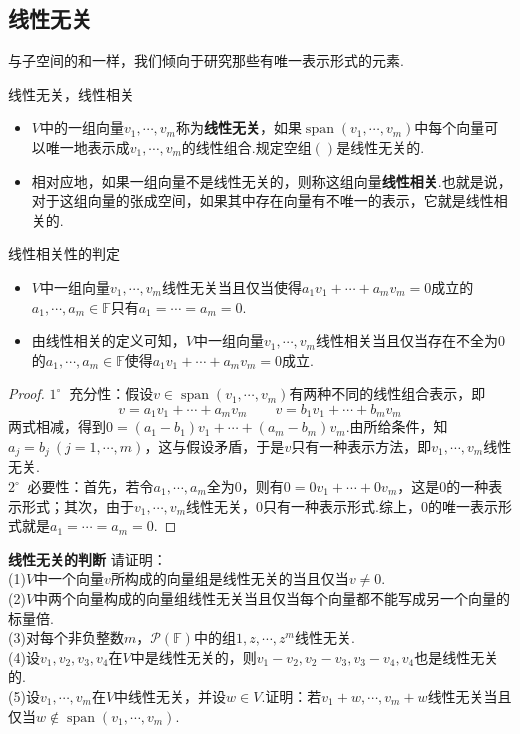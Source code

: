 \documentclass[lang=cn, zihao=5]{elegantbook}
\newcommand{\F}{\mathbb{F}}
\newcommand{\buzhou}[1]{$#1^{\circ} \ $}
\DeclareMathOperator{\spn}{span}
\newcommand{\examplefont}[1]{\color{mgreen} \textbf{#1}}
\begin{document}
\subsection{线性无关}

与子空间的和一样，我们倾向于研究那些有唯一表示形式的元素.

\begin{definition}{线性无关，线性相关}
	\begin{itemize}
		\item $V$中的一组向量$v_1, \cdots , v_m$称为\textbf{线性无关}，如果$\spn (v_1, \cdots ,v_m)$中每个向量可以唯一地表示成$v_1, \cdots ,v_m$的线性组合.规定空组$()$是线性无关的.
		\item 相对应地，如果一组向量不是线性无关的，则称这组向量\textbf{线性相关}.也就是说，对于这组向量的张成空间，如果其中存在向量有不唯一的表示，它就是线性相关的.
	\end{itemize}
\end{definition}

\begin{proposition}{线性相关性的判定}
	\begin{itemize}
		\item $V$中一组向量$v_1, \cdots ,v_m$线性无关当且仅当使得$a_1v_1 + \cdots + a_mv_m = 0$成立的$a_1 , \cdots ,a_m \in \F$只有$a_1= \cdots =a_m =0$.
		\item 由线性相关的定义可知，$V$中一组向量$v_1, \cdots ,v_m$线性相关当且仅当存在不全为$0$的$a_1 , \cdots ,a_m \in \F$使得$a_1v_1 + \cdots + a_mv_m = 0$成立.
	\end{itemize}
\end{proposition}
\begin{proof}
	\buzhou{1} 充分性：假设$v \in \spn (v_1, \cdots , v_m)$有两种不同的线性组合表示，即
	$$v = a_1v_1 + \cdots + a_mv_m \qquad v = b_1v_1 + \cdots + b_mv_m$$
	两式相减，得到$0=(a_1-b_1)v_1 + \cdots + (a_m-b_m)v_m$.由所给条件，知$a_j=b_j ~(j=1,\cdots ,m)$，这与假设矛盾，于是$v$只有一种表示方法，即$v_1, \cdots ,v_m$线性无关. \\
	\buzhou{2} 必要性：首先，若令$a_1, \cdots , a_m$全为$0$，则有$0=0v_1 + \cdots + 0v_m$，这是$0$的一种表示形式；其次，由于$v_1, \cdots ,v_m$线性无关，$0$只有一种表示形式.综上，$0$的唯一表示形式就是$a_1= \cdots = a_m =0$.
\end{proof}

\begin{example}{\examplefont{线性无关的判断}}
	请证明： \\
	(1)$V$中一个向量$v$所构成的向量组是线性无关的当且仅当$v \neq 0$. \\
	(2)$V$中两个向量构成的向量组线性无关当且仅当每个向量都不能写成另一个向量的标量倍. \\
	(3)对每个非负整数$m$，$\mathcal{P} (\F)$中的组$1,z, \cdots ,z^m$线性无关. \\
	(4)设$v_1,v_2,v_3,v_4$在$V$中是线性无关的，则$v_1-v_2,v_2-v_3,v_3-v_4,v_4$也是线性无关的. \\
	(5)设$v_1, \cdots ,v_m$在$V$中线性无关，并设$w \in V$.证明：若$v_1+w , \cdots ,v_m+w$线性无关当且仅当$w \notin \spn (v_1 , \cdots ,v_m)$.
\end{example}
\end{document}
